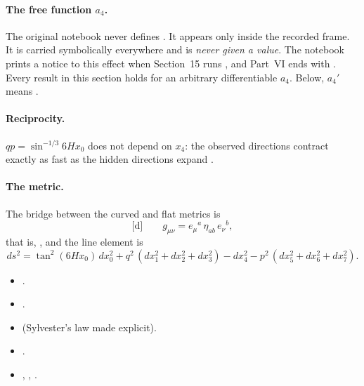 \paragraph{The free function \texorpdfstring{$a_4$}{a4}.} The original notebook never defines
. It appears only inside the recorded frame. It is carried symbolically everywhere and
is \emph{never given a value}. The notebook prints a notice to this effect when Section~15 runs
, and Part~VI ends with 
.
Every result in this section holds for an arbitrary differentiable $a_4$. Below, $a_4'$ means
.

\paragraph{Reciprocity.} $qp=\sin^{-1/3}6Hx_0$ does not depend on $x_4$: the observed directions
contract exactly as fast as the hidden directions expand .

\paragraph{The metric.} The bridge between the curved and flat metrics is
\begin{equation}
  \text{[d]}\qquad g_{\mu\nu}=e_\mu{}^a\,\eta_{ab}\,e_\nu{}^b ,
\end{equation}
that is, , and the line
element is
\begin{equation}
  ds^2=\tan^2(6Hx_0)\,dx_0^2+q^2\,(dx_1^2+dx_2^2+dx_3^2)-dx_4^2-p^2\,(dx_5^2+dx_6^2+dx_7^2).
\end{equation}
\begin{itemize}
  \item {} .
  \item {} .
  \item {}  (Sylvester's law made explicit).
  \item {} .
  \item {} , , .
\end{itemize}

